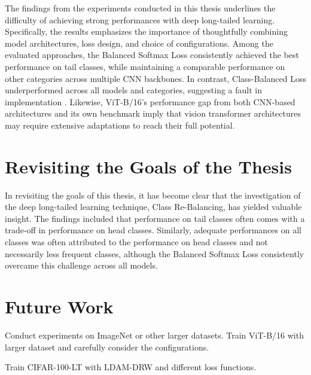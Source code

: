 
The findings from the experiments conducted in this thesis underlines the difficulty of achieving strong performances with deep long-tailed learning. Specifically, the results emphasizes the importance of thoughtfully combining model architectures, loss design, and choice of configurations. Among the evaluated approaches, the Balanced Softmax Loss consistently achieved the best performance on tail classes, while maintaining a comparable performance on other categories across multiple CNN backbones. In contrast, Class-Balanced Loss underperformed across all models and categories, suggesting a fault in implementation . Likewise, ViT-B/16's performance gap from both CNN-based architectures and its own benchmark imply that vision transformer architectures may require extensive adaptations to reach their full potential.  

\section{Revisiting the Goals of the Thesis}
In revisiting the goals of this thesis, it has become clear that the investigation of the deep long-tailed learning technique, Class Re-Balancing, has yielded valuable insight. The findings included that performance on tail classes often comes with a trade-off in performance on head classes. Similarly, adequate performances on all classes was often attributed to the performance on head classes and not necessarily less frequent classes, although the Balanced Softmax Loss consistently overcame this challenge across all models.  

\section{Future Work}
Conduct experiments on ImageNet or other larger datasets. Train ViT-B/16 with larger dataset and carefully consider the configurations.

Train CIFAR-100-LT with LDAM-DRW and different loss functions. 